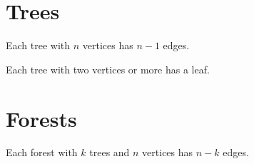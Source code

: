 \documentclass[cmp]{svjour}
\begin{document}
\section{Trees}
\begin{theorem} Each tree with $n$ vertices has $n-1$ edges. \end{theorem}
\begin{lemma} Each tree with two vertices or more has a leaf. \end{lemma}
\section{Forests}
\begin{theorem} Each forest with $k$ trees and $n$ vertices has $n-k$ edges. \end{theorem}
\end{document}
